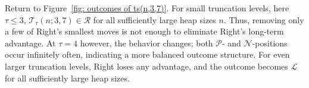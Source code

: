 \documentclass[oneside,reqno]{amsart}
\newcommand{\ts}{\mathcal{T}}
\newcommand{\lp}{\mathscr{L}}
\newcommand{\rp}{\mathscr{R}}
\newcommand{\np}{\mathscr{N}}
\newcommand{\pp}{\mathscr{P}}
\begin{document}
Return to Figure~\ref{fig: outcomes of ts(n,3,7)}. For small truncation levels, here $\tau\le3$, $\ts_\tau(n;3,7)\in\rp$ for all sufficiently large heap sizes $n$. Thus, removing only a few of Right's smallest moves is not enough to eliminate Right's long-term advantage. 
At $\tau=4$ however, the behavior changes; both $\pp$- and $\np$-positions occur infinitely often, indicating a more balanced outcome structure. For even larger truncation levels, Right loses any advantage, and the outcome becomes $\lp$ for all sufficiently large heap sizes.
\end{document}
